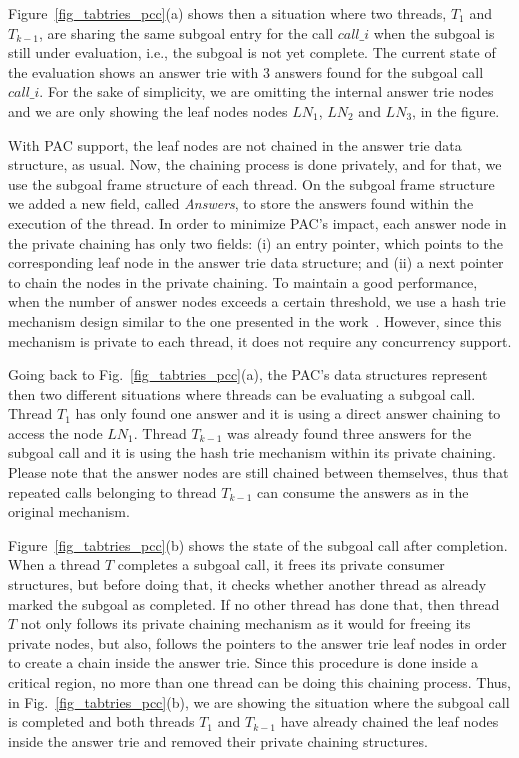 \documentclass{llncs}
\begin{document}
Figure~\ref{fig_tabtries_pcc}(a) shows then a situation where two
threads, $T_1$ and $T_{k-1}$, are sharing the same subgoal entry for
the call $call\_i$ when the subgoal is still under evaluation, i.e.,
the subgoal is not yet complete. The current state of the evaluation
shows an answer trie with 3 answers found for the subgoal call
$call\_i$. For the sake of simplicity, we are omitting the internal
answer trie nodes and we are only showing the leaf nodes nodes $LN_1$,
$LN_2$ and $LN_3$, in the figure.

With PAC support, the leaf nodes are not chained in the answer trie
data structure, as usual. Now, the chaining process is done privately,
and for that, we use the subgoal frame structure of each thread. On
the subgoal frame structure we added a new field, called
\emph{Answers}, to store the answers found within the execution of the
thread. In order to minimize PAC's impact, each answer node in the
private chaining has only two fields: (i) an entry pointer, which
points to the corresponding leaf node in the answer trie data
structure; and (ii) a next pointer to chain the nodes in the private
chaining. To maintain a good performance, when the number of answer
nodes exceeds a certain threshold, we use a hash trie mechanism design
similar to the one presented in the
work~\cite{Areias-ijpp15}. However, since this mechanism is private to
each thread, it does not require any concurrency support.

Going back to Fig.~\ref{fig_tabtries_pcc}(a), the PAC's data
structures represent then two different situations where threads can
be evaluating a subgoal call. Thread $T_1$ has only found one answer
and it is using a direct answer chaining to access the node
$LN_1$. Thread $T_{k-1}$ was already found three answers for the
subgoal call and it is using the hash trie mechanism within its
private chaining. Please note that the answer nodes are still chained
between themselves, thus that repeated calls belonging to thread
$T_{k-1}$ can consume the answers as in the original mechanism.

Figure~\ref{fig_tabtries_pcc}(b) shows the state of the subgoal call
after completion. When a thread $T$ completes a subgoal call, it frees
its private consumer structures, but before doing that, it checks
whether another thread as already marked the subgoal as completed. If
no other thread has done that, then thread $T$ not only follows its
private chaining mechanism as it would for freeing its private nodes,
but also, follows the pointers to the answer trie leaf nodes in order
to create a chain inside the answer trie. Since this procedure is done
inside a critical region, no more than one thread can be doing this
chaining process. Thus, in Fig.~\ref{fig_tabtries_pcc}(b), we are
showing the situation where the subgoal call is completed and both
threads $T_1$ and $T_{k-1}$ have already chained the leaf nodes inside
the answer trie and removed their private chaining structures.
\end{document}
